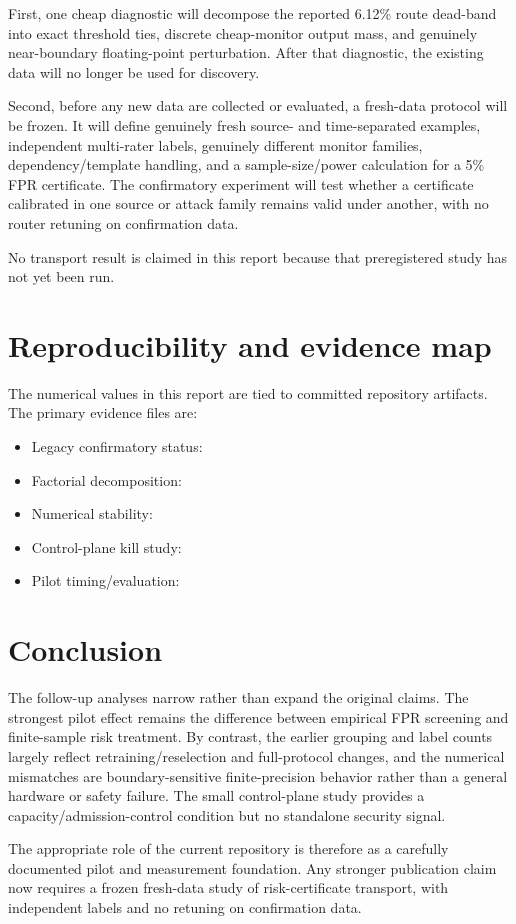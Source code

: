 \documentclass[11pt]{article}
\begin{document}
First, one cheap diagnostic will decompose the reported 6.12\% route dead-band into exact threshold ties, discrete cheap-monitor output mass, and genuinely near-boundary floating-point perturbation. After that diagnostic, the existing data will no longer be used for discovery.

Second, before any new data are collected or evaluated, a fresh-data protocol will be frozen. It will define genuinely fresh source- and time-separated examples, independent multi-rater labels, genuinely different monitor families, dependency/template handling, and a sample-size/power calculation for a 5\% FPR certificate. The confirmatory experiment will test whether a certificate calibrated in one source or attack family remains valid under another, with no router retuning on confirmation data.

No transport result is claimed in this report because that preregistered study has not yet been run.

\section{Reproducibility and evidence map}
The numerical values in this report are tied to committed repository artifacts. The primary evidence files are:
\begin{itemize}
    \item Legacy confirmatory status: 
    \item Factorial decomposition: 
    \item Numerical stability: 
    \item Control-plane kill study: 
    \item Pilot timing/evaluation: 
\end{itemize}

\section{Conclusion}
The follow-up analyses narrow rather than expand the original claims. The strongest pilot effect remains the difference between empirical FPR screening and finite-sample risk treatment. By contrast, the earlier grouping and label counts largely reflect retraining/reselection and full-protocol changes, and the numerical mismatches are boundary-sensitive finite-precision behavior rather than a general hardware or safety failure. The small control-plane study provides a capacity/admission-control condition but no standalone security signal.

The appropriate role of the current repository is therefore as a carefully documented pilot and measurement foundation. Any stronger publication claim now requires a frozen fresh-data study of risk-certificate transport, with independent labels and no retuning on confirmation data.
\end{document}
